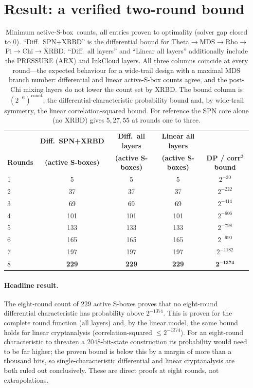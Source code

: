 \documentclass[11pt,a4paper]{article}
\newcommand{\sbx}{\textsf{S-box}}
\newcommand{\sbxes}{\textsf{S-boxes}}
\begin{document}
\section{Result: a verified two-round bound}

\begin{table}[h]
\centering
\begin{tabular}{lcccc}
  \toprule
   & \textbf{Diff.\ SPN+XRBD} & \textbf{Diff.\ all layers} & \textbf{Linear all layers} & \\
  \textbf{Rounds} & \textbf{(active \sbxes)} & \textbf{(active \sbxes)} & \textbf{(active \sbxes)} & \textbf{DP / corr$^2$ bound} \\
  \midrule
  1 & 5   & 5   & 5   & $2^{-30}$   \\
  2 & 37  & 37  & 37  & $2^{-222}$  \\
  3 & 69  & 69  & 69  & $2^{-414}$  \\
  4 & 101 & 101 & 101 & $2^{-606}$  \\
  5 & 133 & 133 & 133 & $2^{-798}$  \\
  6 & 165 & 165 & 165 & $2^{-990}$  \\
  7 & 197 & 197 & 197 & $2^{-1182}$ \\
  8 & \textbf{229} & \textbf{229} & \textbf{229} & $\mathbf{2^{-1374}}$ \\
  \bottomrule
\end{tabular}
\caption{Minimum active-\sbx\ counts, all entries proven to optimality (solver
gap closed to $0$). ``Diff.\ SPN+XRBD'' is the differential bound for
Theta$\to$MDS$\to$Rho$\to$Pi$\to$Chi$\to$XRBD. ``Diff.\ all layers'' and
``Linear all layers'' additionally include the PRESSURE (ARX) and InkCloud
layers. All three columns coincide at every round---the expected behaviour for a
wide-trail design with a maximal MDS branch number: differential and linear
active-S-box counts agree, and the post-Chi mixing layers do not lower the count
set by XRBD. The bound column is $(2^{-6})^{\text{count}}$: the
differential-characteristic probability bound and, by wide-trail symmetry, the
linear correlation-squared bound. For reference the SPN core alone (no XRBD)
gives $5,27,55$ at rounds one to three.}
\label{tab:bounds}
\end{table}

\paragraph{Headline result.}
The eight-round count of $229$ active S-boxes proves that no eight-round
differential characteristic has probability above $2^{-1374}$. This is proven for
the complete round function (all layers) and, by the linear model, the same
bound holds for linear cryptanalysis (correlation-squared $\le 2^{-1374}$). For
an eight-round characteristic to threaten a $2048$-bit-state construction its
probability would need to be far higher; the proven bound is below this by a
margin of more than a thousand bits, so single-characteristic differential and
linear cryptanalysis are both ruled out conclusively. These are direct proofs at
eight rounds, not extrapolations.
\end{document}
